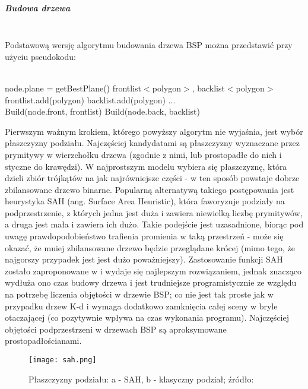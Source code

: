 \subparagraph{Budowa drzewa}\mbox{} \\

Podstawową wersję algorytmu budowania drzewa BSP można przedstawić przy użyciu pseudokodu:

\begin{algorithm}
\begin{algorithmic}
\\
\State node.plane = getBestPlane()
\State frontlist$<$polygon$>$, backlist$<$polygon$>$
\\
    		frontlist.add(polygon)
     		backlist.add(polygon)
     \Else
     		...
     \EndIf
\EndFor
\\
\State Build(node.front, frontlist)
\State Build(node.back, backlist)
\\
\EndFunction
\end{algorithmic}
\end{algorithm}


Pierwszym ważnym krokiem, którego powyższy algorytm nie wyjaśnia, jest wybór płaszczyzny podziału. Najczęściej kandydatami są płaszczyzny wyznaczane przez prymitywy w wierzchołku drzewa (zgodnie z nimi, lub prostopadłe do nich i styczne do krawędzi). W najprostszym modelu wybiera się płaszczyznę, która dzieli zbiór trójkątów na jak najrówniejsze części - w ten sposób powstaje dobrze zbilansowane drzewo binarne. Popularną alternatywą takiego postępowania jest heurystyka SAH \cite{zuk2008, sah1, sah2} (ang. Surface Area Heuristic), która faworyzuje podziały na podprzestrzenie, z których jedna jest duża i zawiera niewielką liczbę prymitywów, a druga jest mała i zawiera ich dużo. Takie podejście jest uzasadnione, biorąc pod uwagę prawdopodobieństwo trafienia promienia w taką przestrzeń - może się okazać, że mniej zbilansowane drzewo będzie przeglądane krócej (mimo tego, że najgorszy przypadek jest jest dużo poważniejszy). Zastosowanie funkcji SAH zostało zaproponowane w \cite{sah1} i wydaje się najlepszym rozwiązaniem, jednak znacząco wydłuża ono czas budowy drzewa i jest trudniejsze programistycznie ze względu na potrzebę liczenia objętości w drzewie BSP; co nie jest tak proste jak w przypadku drzew K-d i wymaga dodatkowo zamknięcia całej sceny w bryle otaczającej (co pozytywnie wpływa na czas wykonania programu). Najczęściej objętości podprzestrzeni w drzewach BSP są aproksymowane prostopadłościanami.

\begin{figure}[h!]
\centering
  \caption{Płaszczyzny podziału: a - SAH, b - klasyczny podział; źródło: \cite{zuk2008}}
  \texttt{[image: sah.png]}
\end{figure}

